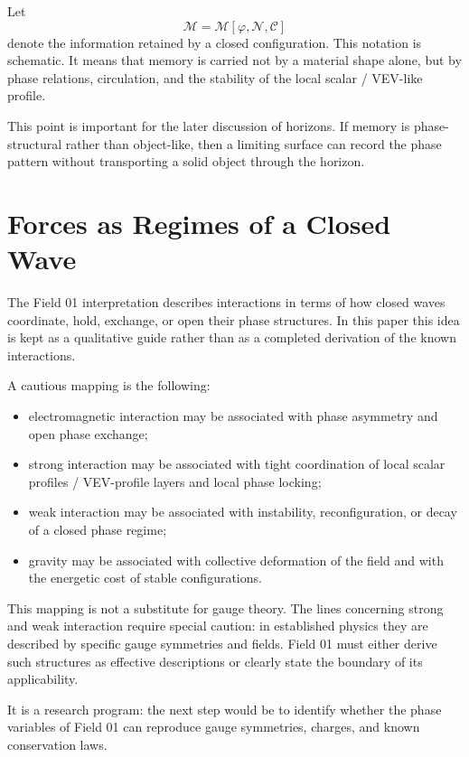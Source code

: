 \documentclass[11pt,a4paper]{article}
\newcommand{\phase}{\varphi}
\newcommand{\normal}{\mathcal{N}}
\newcommand{\memory}{\mathcal{M}}
\newcommand{\contour}{\mathcal{C}}
\begin{document}
Let
\begin{equation}
\memory = \memory[\phase,\normal,\contour]
\end{equation}
denote the information retained by a closed configuration. This notation is schematic. It means that memory is carried not by a material shape alone, but by phase relations, circulation, and the stability of the local scalar / VEV-like profile.

This point is important for the later discussion of horizons. If memory is phase-structural rather than object-like, then a limiting surface can record the phase pattern without transporting a solid object through the horizon.

\section{Forces as Regimes of a Closed Wave}

The Field 01 interpretation describes interactions in terms of how closed waves coordinate, hold, exchange, or open their phase structures. In this paper this idea is kept as a qualitative guide rather than as a completed derivation of the known interactions.

A cautious mapping is the following:
\begin{itemize}
\item electromagnetic interaction may be associated with phase asymmetry and open phase exchange;
\item strong interaction may be associated with tight coordination of local scalar profiles / VEV-profile layers and local phase locking;
\item weak interaction may be associated with instability, reconfiguration, or decay of a closed phase regime;
\item gravity may be associated with collective deformation of the field and with the energetic cost of stable configurations.
\end{itemize}

This mapping is not a substitute for gauge theory. The lines concerning strong and weak interaction require special caution: in established physics they are described by specific gauge symmetries and fields. Field 01 must either derive such structures as effective descriptions or clearly state the boundary of its applicability.

It is a research program: the next step would be to identify whether the phase variables of Field 01 can reproduce gauge symmetries, charges, and known conservation laws.
\end{document}
